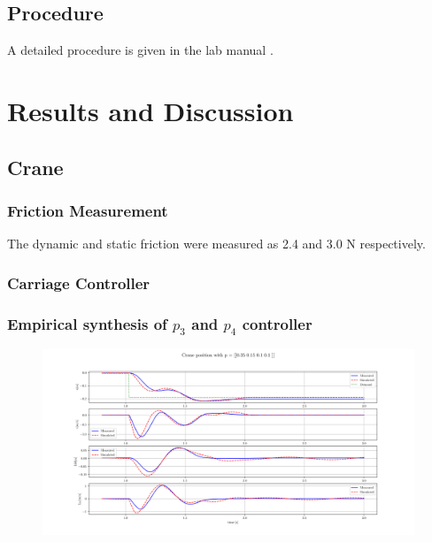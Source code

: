 \documentclass{article}
\begin{document}
\subsection{Procedure}

A detailed procedure is given in the lab manual \cite{handout}.

\section{Results and Discussion}

\subsection{Crane}

\subsubsection{Friction Measurement}

The dynamic and static friction were measured as 2.4 and 3.0 N respectively.

\subsubsection{Carriage Controller}



\subsubsection{Empirical synthesis of $p_3$ and $p_4$ controller}

\begin{figure}[H]
  \centering
  \includegraphics[width=0.99\textwidth]{figures/3.3.png}
  \caption{}
  \label{fig:exp3.3}
\end{figure}
\end{document}
